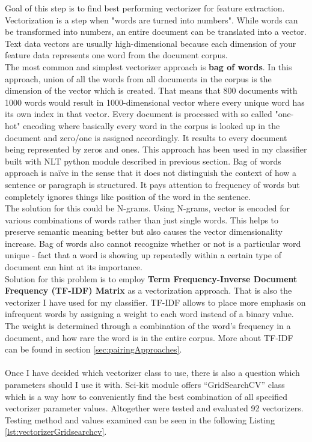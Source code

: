 Goal of this step is to find best performing vectorizer for feature extraction.	Vectorization is a step when "words are turned into numbers". While words can be transformed into numbers, an entire document can be translated into a vector. Text data vectors are usually high-dimensional because each dimension of your feature data represents one word from the document corpus.\\
The most common and simplest vectorizer approach is \textbf{bag of words}.	In this approach, union of all the words from all documents in the corpus is the dimension of the vector which is created. That means that 800 documents with 1000 words would result in 1000-dimensional vector where every unique word has its own index in that vector. Every document is processed with so called "one-hot" encoding where basically every word in the corpus is looked up in the document and zero/one is assigned accordingly. It results to every document being represented by zeros and ones. This approach has been used in my classifier built with NLT python module described in previous section. Bag of words approach is naïve in the sense that it does not distinguish the context of how a sentence or paragraph is structured. It pays attention to frequency of words but completely ignores things like position of the word in the sentence. \\
The solution for this could be N-grams. Using N-grams, vector is encoded for various combinations of words rather than just single words. This helps to preserve semantic meaning better but also causes the vector dimensionality increase. Bag of words also cannot recognize whether or not is a particular word unique - fact that a word is showing up repeatedly within a certain type of document can hint at its importance. \\
Solution for this problem is to employ \textbf{Term Frequency-Inverse Document Frequency (TF-IDF) Matrix} as a vectorization approach. That is also the vectorizer I have used for my classifier. TF-IDF allows to place more emphasis on infrequent words by assigning a weight to each word instead of a binary value. The weight is determined through a combination of the word’s frequency in a document, and how rare the word is in the entire corpus. More about TF-IDF can be found in section \ref{sec:pairingApproaches}. \\
\\
Once I have decided which vectorizer class to use, there is also a question which parameters should I use it with. Sci-kit module offers “GridSearchCV” class which is a way how to conveniently find the best combination of all specified vectorizer parameter values. Altogether were tested and evaluated 92 vectorizers. Testing method and values examined can be seen in the following Listing \ref{lst:vectorizerGridsearchcv}. 
